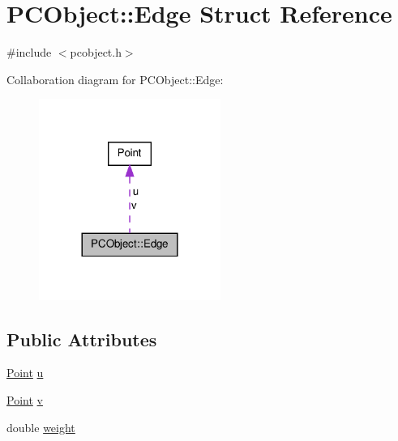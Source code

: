 \hypertarget{struct_p_c_object_1_1_edge}{\section{\-P\-C\-Object\-:\-:\-Edge \-Struct \-Reference}
\label{struct_p_c_object_1_1_edge}
}


{\ttfamily \#include $<$pcobject.\-h$>$}



\-Collaboration diagram for \-P\-C\-Object\-:\-:\-Edge\-:
\nopagebreak
\begin{figure}[H]
\begin{center}
\leavevmode
\includegraphics[width=168pt]{struct_p_c_object_1_1_edge__coll__graph}
\end{center}
\end{figure}
\subsection*{\-Public \-Attributes}
\begin{DoxyCompactItemize}
\item 
\hyperlink{class_point}{\-Point} \hyperlink{struct_p_c_object_1_1_edge_af4067d329722069784adbc2e4df9fc73}{u}
\item 
\hyperlink{class_point}{\-Point} \hyperlink{struct_p_c_object_1_1_edge_aaf9714de2de62884dfb6b682f54896f9}{v}
\item 
double \hyperlink{struct_p_c_object_1_1_edge_a5f7ec9c43abe68d31fb305b8344a2e5b}{weight}
\end{DoxyCompactItemize}


